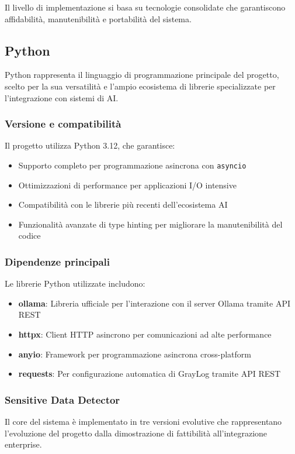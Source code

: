 \documentclass[12pt]{report}
\begin{document}
Il livello di implementazione si basa su tecnologie consolidate che garantiscono affidabilità, manutenibilità e portabilità del sistema.

\subsection{Python}
\label{subsec:python}

Python rappresenta il linguaggio di programmazione principale del progetto, scelto per la sua versatilità e l'ampio ecosistema di librerie specializzate per l'integrazione con sistemi di AI.

\subsubsection{Versione e compatibilità}
Il progetto utilizza Python 3.12, che garantisce:
\begin{itemize}
    \item Supporto completo per programmazione asincrona con \texttt{asyncio}
    \item Ottimizzazioni di performance per applicazioni I/O intensive
    \item Compatibilità con le librerie più recenti dell'ecosistema AI
    \item Funzionalità avanzate di type hinting per migliorare la manutenibilità del codice
\end{itemize}

\subsubsection{Dipendenze principali}
Le librerie Python utilizzate includono:

\begin{itemize}
    \item \textbf{ollama}: Libreria ufficiale per l'interazione con il server Ollama tramite API REST
    \item \textbf{httpx}: Client HTTP asincrono per comunicazioni ad alte performance
    \item \textbf{anyio}: Framework per programmazione asincrona cross-platform
    \item \textbf{requests}: Per configurazione automatica di GrayLog tramite API REST
\end{itemize}

\subsubsection{Sensitive Data Detector}
Il core del sistema è implementato in tre versioni evolutive che rappresentano l'evoluzione del progetto dalla dimostrazione di fattibilità all'integrazione enterprise.
\end{document}
